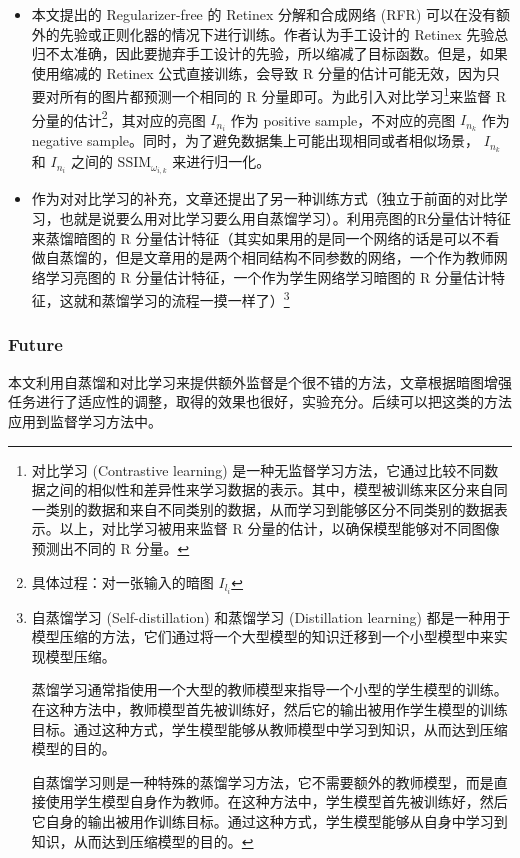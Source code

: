 \documentclass[letterpaper,10pt]{article}
\begin{document}
			\begin{itemize}
				\item [(1)]
				本文提出的 Regularizer-free 的 Retinex 分解和合成网络 (RFR) 可以在没有额外的先验或正则化器的情况下进行训练。作者认为手工设计的 Retinex 先验总归不太准确，因此要抛弃手工设计的先验，所以缩减了目标函数。但是，如果使用缩减的 Retinex 公式直接训练，会导致 R 分量的估计可能无效，因为只要对所有的图片都预测一个相同的 R 分量即可。为此引入对比学习\footnote{对比学习 (Contrastive learning) 是一种无监督学习方法，它通过比较不同数据之间的相似性和差异性来学习数据的表示。其中，模型被训练来区分来自同一类别的数据和来自不同类别的数据，从而学习到能够区分不同类别的数据表示。以上，对比学习被用来监督 R 分量的估计，以确保模型能够对不同图像预测出不同的 R 分量。}来监督 R 分量的估计\footnote{具体过程：对一张输入的暗图 $I_{l_i}$}，其对应的亮图 $I_{n_i}$ 作为 positive sample，不对应的亮图 $I_{n_k}$ 作为 negative sample。同时，为了避免数据集上可能出现相同或者相似场景， $I_{n_k}$ 和 $I_{n_i}$ 之间的 $ \text{SSIM}_{\omega_{i,k}}$ 来进行归一化。
				\item [(2)]
				作为对对比学习的补充，文章还提出了另一种训练方式（独立于前面的对比学习，也就是说要么用对比学习要么用自蒸馏学习）。利用亮图的R分量估计特征来蒸馏暗图的 R 分量估计特征（其实如果用的是同一个网络的话是可以不看做自蒸馏的，但是文章用的是两个相同结构不同参数的网络，一个作为教师网络学习亮图的 R 分量估计特征，一个作为学生网络学习暗图的 R 分量估计特征，这就和蒸馏学习的流程一摸一样了）\footnote{自蒸馏学习 (Self-distillation) 和蒸馏学习 (Distillation learning) 都是一种用于模型压缩的方法，它们通过将一个大型模型的知识迁移到一个小型模型中来实现模型压缩。
					
				蒸馏学习通常指使用一个大型的教师模型来指导一个小型的学生模型的训练。在这种方法中，教师模型首先被训练好，然后它的输出被用作学生模型的训练目标。通过这种方式，学生模型能够从教师模型中学习到知识，从而达到压缩模型的目的。
				
				自蒸馏学习则是一种特殊的蒸馏学习方法，它不需要额外的教师模型，而是直接使用学生模型自身作为教师。在这种方法中，学生模型首先被训练好，然后它自身的输出被用作训练目标。通过这种方式，学生模型能够从自身中学习到知识，从而达到压缩模型的目的。}
				
			\end{itemize}
			
			\subsubsection{Future}
			
			本文利用自蒸馏和对比学习来提供额外监督是个很不错的方法，文章根据暗图增强任务进行了适应性的调整，取得的效果也很好，实验充分。后续可以把这类的方法应用到监督学习方法中。
		
\end{document}
